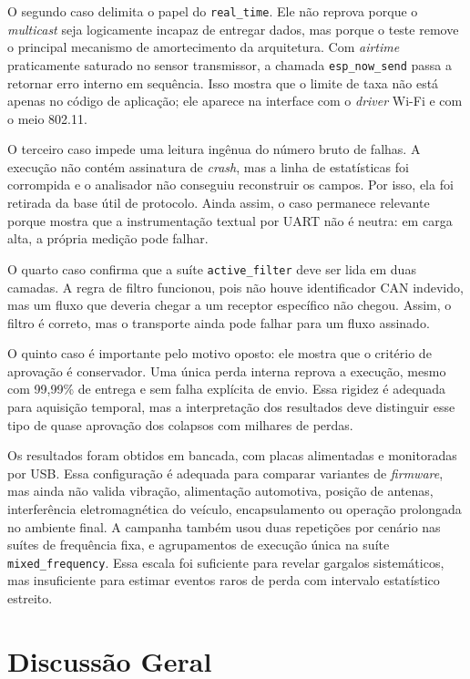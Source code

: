 O segundo caso delimita o papel do \texttt{real\_time}. Ele não reprova porque o
\emph{multicast} seja logicamente incapaz de entregar dados, mas porque o teste remove o
principal mecanismo de amortecimento da arquitetura. Com \emph{airtime} praticamente
saturado no sensor transmissor, a chamada \texttt{esp\_now\_send} passa a retornar erro interno em
sequência. Isso mostra que o limite de taxa não está apenas no código de
aplicação; ele aparece na interface com o \emph{driver} Wi-Fi e com o meio 802.11.

O terceiro caso impede uma leitura ingênua do número bruto de falhas. A execução
não contém assinatura de \emph{crash}, mas a linha de estatísticas foi corrompida e o
analisador não conseguiu reconstruir os campos. Por isso, ela foi retirada da
base útil de protocolo. Ainda assim, o caso permanece relevante porque mostra
que a instrumentação textual por UART não é neutra: em carga alta, a própria
medição pode falhar.

O quarto caso confirma que a suíte \texttt{active\_filter} deve ser lida em duas
camadas. A regra de filtro funcionou, pois não houve identificador CAN indevido, mas um
fluxo que deveria chegar a um receptor específico não chegou. Assim, o filtro é
correto, mas o transporte ainda pode falhar para um fluxo assinado.

O quinto caso é importante pelo motivo oposto: ele mostra que o critério de
aprovação é conservador. Uma única perda interna reprova a execução, mesmo com
99,99\% de entrega e sem falha explícita de envio. Essa rigidez é adequada para
aquisição temporal, mas a interpretação dos resultados deve distinguir esse tipo
de quase aprovação dos colapsos com milhares de perdas.

Os resultados foram obtidos em bancada, com placas alimentadas e monitoradas por
USB. Essa configuração é adequada para comparar variantes de \emph{firmware}, mas ainda
não valida vibração, alimentação automotiva, posição de antenas, interferência
eletromagnética do veículo, encapsulamento ou operação prolongada no ambiente
final. A campanha também usou duas repetições por cenário nas suítes de frequência
fixa, e agrupamentos de execução única na suíte \texttt{mixed\_frequency}. Essa
escala foi suficiente para revelar gargalos sistemáticos, mas insuficiente para
estimar eventos raros de perda com intervalo estatístico estreito.

\section{Discussão Geral}

